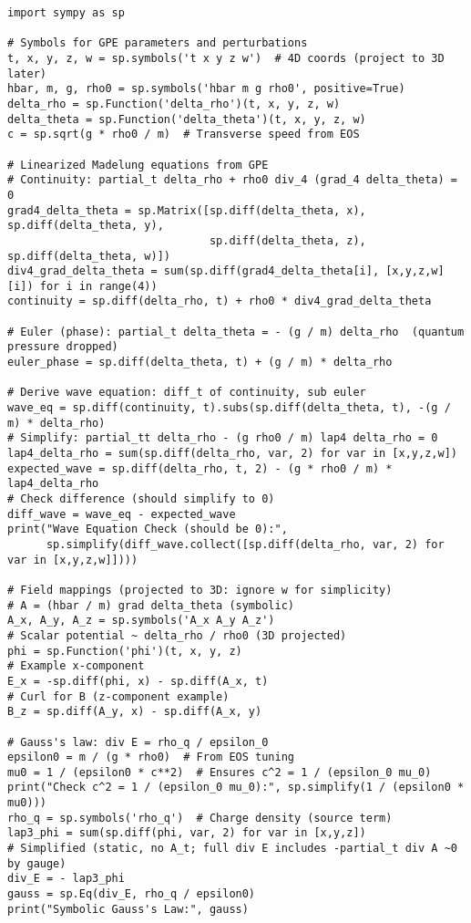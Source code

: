 \documentclass{article}
\begin{document}
\begin{verbatim}
import sympy as sp

# Symbols for GPE parameters and perturbations
t, x, y, z, w = sp.symbols('t x y z w')  # 4D coords (project to 3D later)
hbar, m, g, rho0 = sp.symbols('hbar m g rho0', positive=True)
delta_rho = sp.Function('delta_rho')(t, x, y, z, w)
delta_theta = sp.Function('delta_theta')(t, x, y, z, w)
c = sp.sqrt(g * rho0 / m)  # Transverse speed from EOS

# Linearized Madelung equations from GPE
# Continuity: partial_t delta_rho + rho0 div_4 (grad_4 delta_theta) = 0
grad4_delta_theta = sp.Matrix([sp.diff(delta_theta, x), sp.diff(delta_theta, y),
                               sp.diff(delta_theta, z), sp.diff(delta_theta, w)])
div4_grad_delta_theta = sum(sp.diff(grad4_delta_theta[i], [x,y,z,w][i]) for i in range(4))
continuity = sp.diff(delta_rho, t) + rho0 * div4_grad_delta_theta

# Euler (phase): partial_t delta_theta = - (g / m) delta_rho  (quantum pressure dropped)
euler_phase = sp.diff(delta_theta, t) + (g / m) * delta_rho

# Derive wave equation: diff_t of continuity, sub euler
wave_eq = sp.diff(continuity, t).subs(sp.diff(delta_theta, t), -(g / m) * delta_rho)
# Simplify: partial_tt delta_rho - (g rho0 / m) lap4 delta_rho = 0
lap4_delta_rho = sum(sp.diff(delta_rho, var, 2) for var in [x,y,z,w])
expected_wave = sp.diff(delta_rho, t, 2) - (g * rho0 / m) * lap4_delta_rho
# Check difference (should simplify to 0)
diff_wave = wave_eq - expected_wave
print("Wave Equation Check (should be 0):",
      sp.simplify(diff_wave.collect([sp.diff(delta_rho, var, 2) for var in [x,y,z,w]])))

# Field mappings (projected to 3D: ignore w for simplicity)
# A = (hbar / m) grad delta_theta (symbolic)
A_x, A_y, A_z = sp.symbols('A_x A_y A_z')
# Scalar potential ~ delta_rho / rho0 (3D projected)
phi = sp.Function('phi')(t, x, y, z)
# Example x-component
E_x = -sp.diff(phi, x) - sp.diff(A_x, t)
# Curl for B (z-component example)
B_z = sp.diff(A_y, x) - sp.diff(A_x, y)

# Gauss's law: div E = rho_q / epsilon_0
epsilon0 = m / (g * rho0)  # From EOS tuning
mu0 = 1 / (epsilon0 * c**2)  # Ensures c^2 = 1 / (epsilon_0 mu_0)
print("Check c^2 = 1 / (epsilon_0 mu_0):", sp.simplify(1 / (epsilon0 * mu0)))
rho_q = sp.symbols('rho_q')  # Charge density (source term)
lap3_phi = sum(sp.diff(phi, var, 2) for var in [x,y,z])
# Simplified (static, no A_t; full div E includes -partial_t div A ~0 by gauge)
div_E = - lap3_phi
gauss = sp.Eq(div_E, rho_q / epsilon0)
print("Symbolic Gauss's Law:", gauss)
\end{verbatim}
\end{document}

